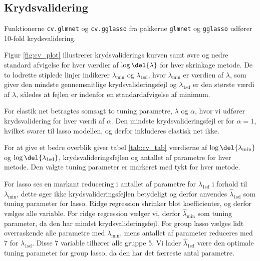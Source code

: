\subsection{Krydsvalidering}
Funktionerne \texttt{cv.glmnet} og \texttt{cv.gglasso} fra pakkerne \texttt{glmnet} og \texttt{gglasso} udfører 10-fold krydsvalidering.

Figur \ref{fig:cv_plot} illustrerer krydsvaliderings kurven samt øvre og nedre standard afvigelse for hver værdier af $\log \del{\lambda}$ for hver skrinkage metode.
De to lodrette stiplede linjer indikerer \(\lambda_{\text{min}}\) og \(\lambda_\text{1sd}\), hvor \(\lambda_{\text{min}}\) er værdien af \(\lambda\), som giver den mindste gennemsnitlige krydsvalideringsfejl og \(\lambda_\text{1sd}\) er den største værdi af \(\lambda\), således at fejlen er indenfor en standardafvigelse af minimum. 

For elastik net betragtes somsagt to tuning parametre, \(\lambda\) og \(\alpha\), hvor vi udfører krydsvalidering for hver værdi af \(\alpha\). 
Den mindste krydsvalideringsfejl er for $\alpha =1$, hvilket svarer til lasso modellen, og derfor inkluderes elastisk net ikke. 
%
%



For at give et bedre overblik giver tabel \ref{tab:cv_tab} værdierne af $\log \del{ \lambda_{\min}}$ og $\log \del{ \lambda_{1\text{sd}}}$, krydsvalideringsfejlen og antallet af parametre for hver metode.
Den valgte tuning parameter er markeret med tykt for hver metode.   

For lasso ses en markant reducering i antallet af parametre for $\lambda_{1\text{sd}}$ i forhold til $\lambda_{\min}$, dette øger ikke krydsvalideringsfejlen betydeligt og derfor anvendes $\widehat{\lambda}_{1\text{sd}}$ som tuning parameter for lasso. 
Ridge regression shrinker blot koefficienter, og derfor vælges alle variable.
For ridge regression vælger vi, derfor $\widehat{\lambda}_{\min}$ som tuning parameter, da den har mindst krydsvalideringsfejl.
For group lasso vælges lidt overraskende alle parametre med \(\lambda_\text{min}\), mens antallet af parameter reduceres med 7 for $\lambda_{1\text{sd}}$. Disse 7 variable tilhører alle gruppe 5.
Vi lader $\widehat{\lambda}_{1\text{sd}}$ være den optimale tuning parameter for group lasso, da den har det færreste antal parametre. 

